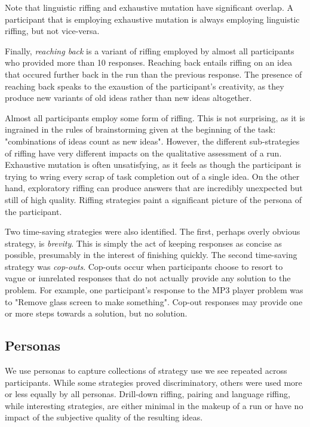 Note that linguistic riffing and exhaustive mutation have significant overlap. A participant that is employing exhaustive mutation is always employing linguistic riffing, but not vice-versa.

Finally, \emph{reaching back} is a variant of riffing employed by almost all participants who provided more than 10 responses. Reaching back entails riffing on an idea that occured further back in the run than the previous response. The presence of reaching back speaks to the exaustion of the participant's creativity, as they produce new variants of old ideas rather than new ideas altogether.

Almost all participants employ some form of riffing. This is not surprising, as it is ingrained in the rules of brainstorming given at the beginning of the task: "combinations of ideas count as new ideas". However, the different sub-strategies of riffing have very different impacts on the qualitative assessment of a run. Exhaustive mutation is often unsatisfying, as it feels as though the participant is trying to wring every scrap of task completion out of a single idea. On the other hand, exploratory riffing can produce answers that are incredibly unexpected but still of high quality. Riffing strategies paint a significant picture of the persona of the participant.

Two time-saving strategies were also identified. The first, perhaps overly obvious strategy, is \emph{brevity}. This is simply the act of keeping responses as concise as possible, presumably in the interest of finishing quickly. The second time-saving strategy was \emph{cop-outs}. Cop-outs occur when participants choose to resort to vague or iunrelated responses that do not actually provide any solution to the problem. For example, one participant's response to the MP3 player problem was to "Remove glass screen to make something". Cop-out responses may provide one or more steps towards a solution, but no solution.

\subsection{Personas}

We use personas to capture collections of strategy use we see repeated across participants. While some strategies proved discriminatory, others were used more or less equally by all personas. Drill-down riffing, pairing and language riffing, while interesting strategies, are either minimal in the makeup of a run or have no impact of the subjective quality of the resulting ideas.

